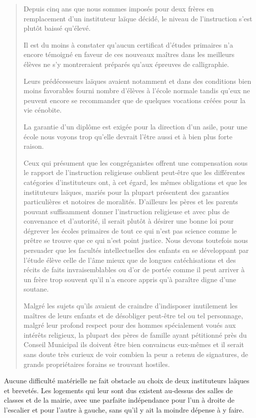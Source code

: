 \begin{quote}
Depuis cinq ans que nous sommes imposés pour deux frères en remplacement d'un instituteur laïque décidé, le niveau de l'instruction s'est plutôt baissé qu'élevé.

Il est du moins à constater qu'aucun certificat d'études primaires n'a encore témoigné en faveur de ces nouveaux maîtres dans les meilleurs élèves ne s'y montreraient préparés qu'aux épreuves de calligraphie.

Leurs prédécesseurs laïques avaient notamment et dans des conditions bien moins favorables fourni nombre d'élèves à l'école normale tandis qu'eux ne peuvent encore se recommander que de quelques vocations créées pour la vie cénobite.

La garantie d'un diplôme est exigée pour la direction d'un asile, pour une école nous voyons trop qu'elle devrait l'être aussi et à bien plus forte raison.

Ceux qui présument que les congréganistes offrent une compensation sous le rapport de l'instruction religieuse oublient peut-être que les différentes catégories d'instituteurs ont, à cet égard, les mêmes obligations et que les instituteurs laïques, mariés pour la plupart présentent des garanties particulières et notoires de moralités. D'ailleurs les pères et les parents pouvant suffisamment donner l'instruction religieuse et avec plus de convenance et d'autorité, il serait plutôt à désirer une bonne loi pour dégrever les écoles primaires de tout ce qui n'est pas science comme le prêtre se trouve que ce qui n'est point justice. Nous devons toutefois nous persuader que les facultés intellectuelles des enfants en se développant par l'étude élève celle de l'âme mieux que de longues catéchisations et des récits de faits invraisemblables ou d'or de portée comme il peut arriver à un frère trop souvent qu'il n'a encore appris qu'à paraître digne d'une soutane.

Malgré les sujets qu'ils avaient de craindre d'indisposer inutilement les maîtres de leurs enfants et de désobliger peut-être tel ou tel personnage, malgré leur profond respect pour des hommes spécialement
voués aux intérêts religieux, la plupart des pères de famille ayant pétitionné près du Conseil Municipal ils doivent être bien convaincus eux-mêmes et il serait sans doute très curieux de voir combien la peur a retenu de signatures, de grands propriétaires forains se trouvant hostiles.
\end{quote}

Aucune difficulté matérielle ne fait obstacle au choix de deux instituteurs laïques et brevetés. Les logements qui leur sont dus existent au-dessus des salles de classes et de la mairie, avec une parfaite indépendance pour l'un à droite de l'escalier et pour l'autre à gauche, sans qu'il y ait la moindre dépense à y faire.

